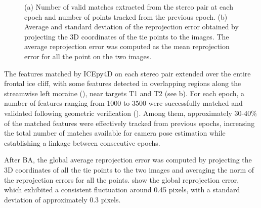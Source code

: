 \begin{figure}
  \centering
  \caption{(a) Number of valid matches extracted from the stereo pair at each epoch and
    number of points tracked from the previous epoch.
    (b) Average and standard deviation of the reprojection error
    obtained by projecting the 3D coordinates of the tie points to the images.
    The average reprojection error was computed as the mean
    reprojection error for all the point on the two images.}
  \label{fig:4:matches_stats}
\end{figure}

The features matched by ICEpy4D on each stereo pair extended over the entire
frontal ice cliff, with some features detected in overlapping regions along the
streamwise left moraine (), near targets T1 and T2
(see b).
For each epoch, a number of features ranging from 1000 to 3500 were successfully matched
and validated following geometric verification ().
Among them, approximately 30-40\% of the matched features were effectively tracked
from previous epochs, increasing the total number of matches available for
camera pose estimation while establishing a linkage between consecutive epochs.

After BA, the global average reprojection error was computed by projecting the 3D
coordinates of all the tie points to the two images and averaging
the norm of the reprojection errors for all the points.
 show the global reprojection error, which exhibited a
consistent fluctuation around 0.45 pixels, with a standard deviation of approximately 0.3
pixels.

